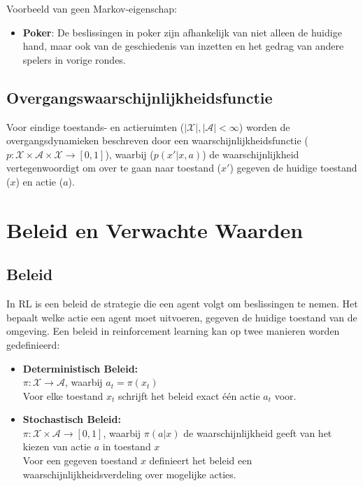\documentclass[a4paper,12pt]{report}
\begin{document}
Voorbeeld van geen Markov-eigenschap:
\begin{itemize}
    \item \textbf{Poker}: De beslissingen in poker zijn afhankelijk van niet alleen de huidige hand, maar ook van de geschiedenis van inzetten en het gedrag van andere spelers in vorige rondes.
\end{itemize}

\subsection{Overgangswaarschijnlijkheidsfunctie}
Voor eindige toestands- en actieruimten (\(|\mathcal{X}|, |\mathcal{A}| <
\infty\)) worden de overgangsdynamieken beschreven door een
waarschijnlijkheidsfunctie (\(p: \mathcal{X} \times \mathcal{A} \times
\mathcal{X} \to [0,1]\)), waarbij (\(p(x'|x,a)\)) de waarschijnlijkheid
vertegenwoordigt om over te gaan naar toestand (\(x'\)) gegeven de huidige
toestand (\(x\)) en actie (\(a\)).

\section{Beleid en Verwachte Waarden}

\subsection{Beleid}
In RL is een beleid de strategie die een agent volgt om beslissingen te nemen.
Het bepaalt welke actie een agent moet uitvoeren, gegeven de huidige toestand
van de omgeving. Een beleid in reinforcement learning kan op twee manieren
worden gedefinieerd:

\begin{itemize}
    \item \textbf{Deterministisch Beleid:} \\
          \(\pi: \mathcal{X} \to \mathcal{A}\), waarbij \(a_t = \pi(x_t)\) \\
          Voor elke toestand \(x_t\) schrijft het beleid exact één actie \(a_t\) voor.

    \item \textbf{Stochastisch Beleid:} \\
          \(\pi: \mathcal{X} \times \mathcal{A} \to [0,1]\), waarbij \(\pi(a|x)\) de waarschijnlijkheid geeft van het kiezen van actie \(a\) in toestand \(x\) \\
          Voor een gegeven toestand \(x\) definieert het beleid een waarschijnlijkheidsverdeling over mogelijke acties.
\end{itemize}
\end{document}
